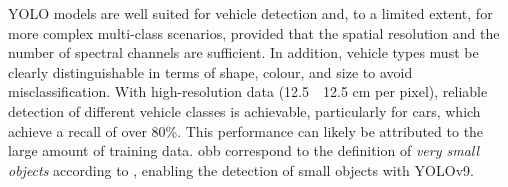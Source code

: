 \acrshort{YOLO} models are well suited for vehicle detection and, to a limited extent, for more complex multi-class scenarios, provided that the spatial resolution and the number of spectral channels are sufficient. In addition, vehicle types must be clearly distinguishable in terms of shape, colour, and size to avoid misclassification. With high-resolution data (12.5~\texttimes~12.5 cm per pixel), reliable detection of different vehicle classes is achievable, particularly for cars, which achieve a recall of over 80\%. This performance can likely be attributed to the large amount of training data. \acrshort{obb} correspond to the definition of \textit{very small objects} according to \citeauthor{Chen2017} \cite{Chen2017}, enabling the detection of small objects with \acrshort{YOLO}v9.  




